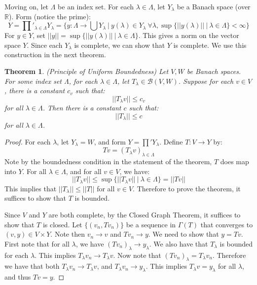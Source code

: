 \documentclass[a4paper,12pt]{report}
\newcommand{\ms}[1]{\mathscr{#1}}
\newtheorem{theorem}{Theorem}[section]
\begin{document}
	\noindent Moving on, let $\Lambda$ be an index set. For each $\lambda \in \Lambda$, let $Y_\lambda$ be a Banach space (over $\mathbb{R}$). Form (notice the prime):
	\[ Y = \prod'_{\lambda \in \Lambda}  Y_\lambda = \bigg\{ y : \Lambda \rightarrow \bigcup Y_\lambda ~\big|~ y(\lambda) \in Y_\lambda ~ \forall \lambda, \sup \big\{||y(\lambda)|| ~|~ \lambda \in \Lambda \big\} < \infty \bigg\} \]
	For $y \in Y$, set $||y|| = \sup \big\{ ||y(\lambda)|| ~|~ \lambda \in \Lambda \big\}$. This gives a norm on the vector space $Y$. Since each $Y_\lambda$ is complete, we can show that $Y$ is complete. We use this construction in the next theorem.
	
	\begin{theorem}
	\emph{(\emph{Principle of Uniform Boundedness})}
	Let $V, W$ be Banach spaces. For some index set $\Lambda$, for each $\lambda \in \Lambda$, let $T_\lambda \in \ms{B}(V, W)$. Suppose for each $v \in V$, there is a constant $c_v$ such that:
	\[ ||T_\lambda v|| \leq c_v \]
	for all $\lambda \in \Lambda$. 
	Then there is a constant $c$ such that:
	\[ ||T_\lambda|| \leq c \]
	for all $\lambda \in \Lambda$.
	\end{theorem}
	\begin{proof}
	For each $\lambda$, let $Y_\lambda = W$, and form $Y = \prod ' Y_\lambda$. Define $T: V \rightarrow Y$ by:
	\[ Tv = (T_\lambda v)_{\lambda \in \Lambda} \]
	Note by the boundedness condition in the statement of the theorem, $T$ does map into $Y$. For all $\lambda \in \Lambda$, and for all $v \in V$, we have:
	\[ ||T_\lambda v|| \leq \sup \big\{||T_\lambda v|| ~|~ \lambda \in \Lambda \big\} = ||Tv|| \]
	This implies that $||T_\lambda|| \leq ||T||$ for all $v \in V$. Therefore to prove the theorem, it suffices to show that $T$ is bounded. 
	
	Since $V$ and $Y$ are both complete, by the Closed Graph Theorem, it suffices to show that $T$ is closed. Let $\{(v_n, Tv_n)\}$ be a sequence in $\Gamma(T)$ that converges to $(v, y) \in V \times Y$. Note then $v_n \rightarrow v$ and $Tv_n \rightarrow y$. We need to show that $y = Tv$. First note that for all $\lambda$, we have $(Tv_n)_\lambda \rightarrow y_\lambda$. We also have that $T_\lambda$ is bounded for each $\lambda$. This implies $T_\lambda v_n \rightarrow T_\lambda v$. Now note that $(Tv_n)_\lambda = T_\lambda v_n$. Therefore we have that both $T_\lambda v_n \rightarrow T_\lambda v$, and $T_\lambda v_n \rightarrow y_\lambda$. This implies $T_\lambda v = y_\lambda$ for all $\lambda$, and thus $Tv = y$. 
	\end{proof}
	
\end{document}
